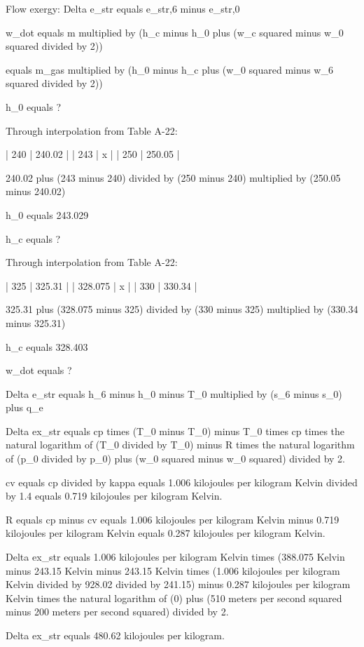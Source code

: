 Flow exergy:  
Delta e_str equals e_str,6 minus e_str,0  

w_dot equals m multiplied by (h_c minus h_0 plus (w_c squared minus w_0 squared divided by 2))  

equals m_gas multiplied by (h_0 minus h_c plus (w_0 squared minus w_6 squared divided by 2))  

h_0 equals ?  

Through interpolation from Table A-22:  

| 240 | 240.02 |  
| 243 | x |  
| 250 | 250.05 |  

240.02 plus (243 minus 240) divided by (250 minus 240) multiplied by (250.05 minus 240.02)  

h_0 equals 243.029  

h_c equals ?  

Through interpolation from Table A-22:  

| 325 | 325.31 |  
| 328.075 | x |  
| 330 | 330.34 |  

325.31 plus (328.075 minus 325) divided by (330 minus 325) multiplied by (330.34 minus 325.31)  

h_c equals 328.403  

w_dot equals ?  

Delta e_str equals h_6 minus h_0 minus T_0 multiplied by (s_6 minus s_0) plus q_e

Delta ex_str equals cp times (T_0 minus T_0) minus T_0 times cp times the natural logarithm of (T_0 divided by T_0) minus R times the natural logarithm of (p_0 divided by p_0) plus (w_0 squared minus w_0 squared) divided by 2.

cv equals cp divided by kappa equals 1.006 kilojoules per kilogram Kelvin divided by 1.4 equals 0.719 kilojoules per kilogram Kelvin.

R equals cp minus cv equals 1.006 kilojoules per kilogram Kelvin minus 0.719 kilojoules per kilogram Kelvin equals 0.287 kilojoules per kilogram Kelvin.

Delta ex_str equals 1.006 kilojoules per kilogram Kelvin times (388.075 Kelvin minus 243.15 Kelvin minus 243.15 Kelvin times (1.006 kilojoules per kilogram Kelvin divided by 928.02 divided by 241.15) minus 0.287 kilojoules per kilogram Kelvin times the natural logarithm of (0) plus (510 meters per second squared minus 200 meters per second squared) divided by 2.

Delta ex_str equals 480.62 kilojoules per kilogram.